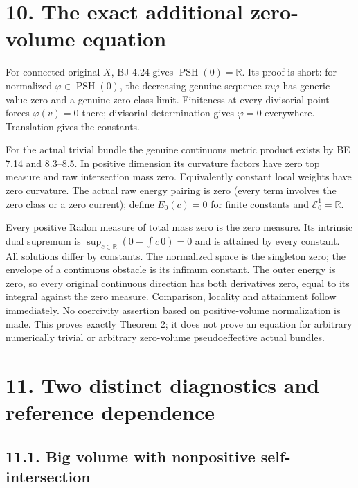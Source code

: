 \documentclass[
  10pt,
]{article}
\begin{document}
\section{10. The exact additional zero-volume
equation}\label{the-exact-additional-zero-volume-equation}

For connected original \(X\), BJ 4.24 gives
\(\operatorname{PSH}(0)=\mathbb R\). Its proof is short: for normalized
\(\varphi\in\operatorname{PSH}(0)\), the decreasing genuine sequence
\(m\varphi\) has generic value zero and a genuine zero-class limit.
Finiteness at every divisorial point forces \(\varphi(v)=0\) there;
divisorial determination gives \(\varphi=0\) everywhere. Translation
gives the constants.

For the actual trivial bundle the genuine continuous metric product
exists by BE 7.14 and 8.3--8.5. In positive dimension its curvature
factors have zero top measure and raw intersection mass zero.
Equivalently constant local weights have zero curvature. The actual raw
energy pairing is zero (every term involves the zero class or a zero
current); define \(E_0(c)=0\) for finite constants and
\(\mathcal E_0^1=\mathbb R\).

Every positive Radon measure of total mass zero is the zero measure. Its
intrinsic dual supremum is \(\sup_{c\in\mathbb R}(0-\int c\,0)=0\) and
is attained by every constant. All solutions differ by constants. The
normalized space is the singleton zero; the envelope of a continuous
obstacle is its infimum constant. The outer energy is zero, so every
original continuous direction has both derivatives zero, equal to its
integral against the zero measure. Comparison, locality and attainment
follow immediately. No coercivity assertion based on positive-volume
normalization is made. This proves exactly Theorem 2; it does not prove
an equation for arbitrary numerically trivial or arbitrary zero-volume
pseudoeffective actual bundles.

\section{11. Two distinct diagnostics and reference
dependence}\label{two-distinct-diagnostics-and-reference-dependence}

\subsection{11.1. Big volume with nonpositive
self-intersection}\label{big-volume-with-nonpositive-self-intersection}
\end{document}
